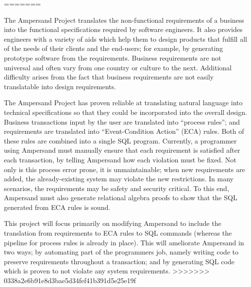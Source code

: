 \documentclass[12pt]{article}
\begin{document}
=======
\date{September 25, 2015}
\thispagestyle{empty}
\maketitle


The Ampersand Project translates the non-functional requirements of a
business into the functional specifications required by software engineers. It
also provides engineers with a variety of aids which help them to design
products that fulfill all of the needs of their clients and the end-users; for
example, by generating prototype software from the requirements.
Business requirements are not universal and often vary from one country or
culture to the next. Additional difficulty arises from the fact that business
requirements are not easily translatable into design requirements. 

The Ampersand Project has proven reliable at translating natural
language into technical specifications so that they could be incorporated into
the overall design. Business transactions input by the user are translated into
``process rules''; and requirements are translated into ``Event-Condition
Action'' (ECA) rules. Both of these rules are combined into a single SQL
program. Currently, a programmer using Ampersand must manually ensure that each
requirement is satisfied after each transaction, by telling Ampersand how each
violation must be fixed. Not only is this process error prone, it is
unmaintainable; when new requirements are added, the already-existing system may
violate the new restrictions. In many scenarios, the requirements may be safety
and security critical. To this end, Ampersand must also generate relational
algebra proofs to show that the SQL generated from ECA rules is sound. 

This project will focus primarily on modifying Ampersand to include the
translation from requirements to ECA rules to SQL commands (whereas the pipeline
for process rules is already in place). This will ameliorate Ampersand in two
ways; by automating part of the programmers job, namely writing code to preserve
requirements throughout a transaction; and by generating SQL code which is
proven to not violate any system requirements. 
>>>>>>> 0338a2e6b91e8d3bae5d34fef41b391d5e25e19f
\end{document}
